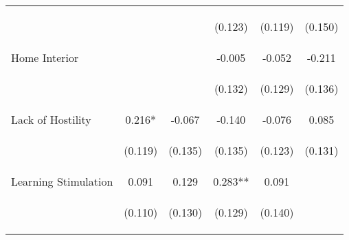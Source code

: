 \begin{tabular}{lccccc}
 & \begin{footnotesize}\end{footnotesize} & \begin{footnotesize}\end{footnotesize} & \begin{footnotesize}(0.123)\end{footnotesize} & \begin{footnotesize}(0.119)\end{footnotesize} & \begin{footnotesize}(0.150)\end{footnotesize}\\
\noalign{\smallskip}Home Interior &  &  & -0.005 & -0.052 & -0.211\\
 & \begin{footnotesize}\end{footnotesize} & \begin{footnotesize}\end{footnotesize} & \begin{footnotesize}(0.132)\end{footnotesize} & \begin{footnotesize}(0.129)\end{footnotesize} & \begin{footnotesize}(0.136)\end{footnotesize}\\
\noalign{\smallskip}Lack of Hostility & 0.216* & -0.067 & -0.140 & -0.076 & 0.085\\
 & \begin{footnotesize}(0.119)\end{footnotesize} & \begin{footnotesize}(0.135)\end{footnotesize} & \begin{footnotesize}(0.135)\end{footnotesize} & \begin{footnotesize}(0.123)\end{footnotesize} & \begin{footnotesize}(0.131)\end{footnotesize}\\
\noalign{\smallskip}Learning Stimulation & 0.091 & 0.129 & 0.283** & 0.091 & \\
 & \begin{footnotesize}(0.110)\end{footnotesize} & \begin{footnotesize}(0.130)\end{footnotesize} & \begin{footnotesize}(0.129)\end{footnotesize} & \begin{footnotesize}(0.140)\end{footnotesize} & \begin{footnotesize}\end{footnotesize}\\

\end{tabular}
